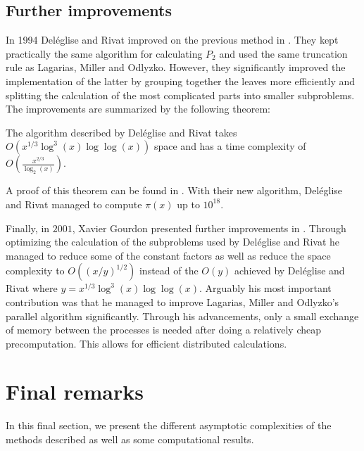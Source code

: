 \subsection{Further improvements}
In 1994 Deléglise and Rivat improved on the previous method in \cite{deleglise96}.
They kept practically the same algorithm for calculating $P_2$ and used the same truncation rule as Lagarias, Miller and Odlyzko.
However, they significantly improved the implementation of the latter
by grouping together the leaves more efficiently and splitting the calculation of the most
complicated parts into smaller subproblems. The improvements are summarized by the following theorem:
\begin{theorem}
	The algorithm described by Deléglise and Rivat takes $O(x^{1 / 3} \log^3(x) \log \log(x))$ space
	and has a time complexity of $O(\frac{x^{2 / 3}}{\log_2(x)})$.
\end{theorem}
A proof of this theorem can be found in \cite{deleglise96}.
With their new algorithm, Deléglise and Rivat managed to compute $\pi(x)$ up to $10^{18}$.

Finally, in $2001$, Xavier Gourdon presented further improvements in \cite{gourdon01}. Through optimizing the calculation
of the subproblems used by Deléglise and Rivat he managed to reduce some of the constant factors as well as
reduce the space complexity to $O((x / y)^{1 / 2})$ instead of the $O(y)$ achieved by Deléglise and Rivat
where $y = x^{1 / 3} \log^3(x) \log \log(x)$.
Arguably his most important contribution was that he managed to improve Lagarias, Miller and Odlyzko's 
parallel algorithm significantly. Through his advancements, only a small exchange of memory between the processes is needed
after doing a relatively cheap precomputation.
This allows for efficient distributed calculations.

\newpage
\section{Final remarks}
In this final section, we present the different asymptotic complexities of the methods described as well as some computational results.

